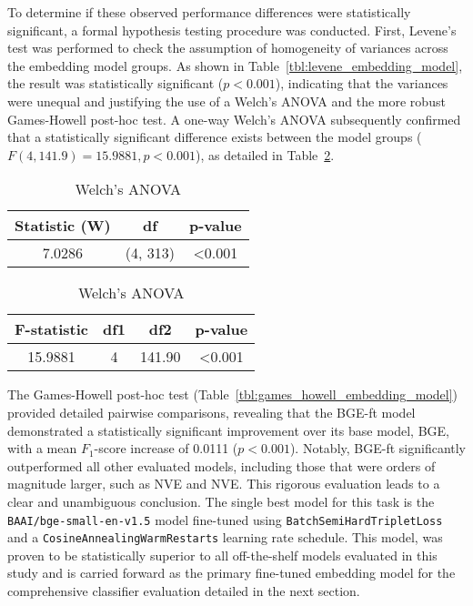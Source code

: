To determine if these observed performance differences were statistically significant, a formal hypothesis testing procedure was conducted. First, Levene's test was performed to check the assumption of homogeneity of variances across the embedding model groups. As shown in Table~\ref{tbl:levene_embedding_model}, the result was statistically significant (\(p < 0.001\)), indicating that the variances were unequal and justifying the use of a Welch's ANOVA and the more robust Games-Howell post-hoc test. A one-way Welch's ANOVA subsequently confirmed that a statistically significant difference exists between the model groups (\(F(4, 141.9) = 15.9881, p < 0.001\)), as detailed in Table~\ref{tbl:anova_embedding_model}.

\begin{table}[tb]
    \captionsetup{skip=5pt}
\centering
\caption{Statistical Tests for F1-Scores by Embedding Model (Test Data)}
\label{tbl:stats_embedding_model}
\begin{subtable}{\linewidth}
\centering
\caption{Levene's Test for Homogeneity of Variances}
\label{tbl:levene_embedding_model}
\begin{tabular}{ccc}
\toprule
\textbf{Statistic (W)} & \textbf{df} & \textbf{p-value} \\
\midrule
7.0286 & (4, 313) & <0.001 \\
\bottomrule
\end{tabular}
\end{subtable}%
\vspace{1em}
\begin{subtable}{\linewidth}
\centering
\caption{Welch's ANOVA}
\label{tbl:anova_embedding_model}
\begin{tabular}{cccc}
\toprule
\textbf{F-statistic} & \textbf{df1} & \textbf{df2} & \textbf{p-value} \\
\midrule
15.9881 & 4 & 141.90 & <0.001 \\
\bottomrule
\end{tabular}
\end{subtable}
\end{table}

The Games-Howell post-hoc test (Table~\ref{tbl:games_howell_embedding_model}) provided detailed pairwise comparisons, revealing that the BGE-ft model demonstrated a statistically significant improvement over its base model, BGE, with a mean \(F_1\)-score increase of 0.0111 (\(p<0.001\)). Notably, BGE-ft significantly outperformed all other evaluated models, including those that were orders of magnitude larger, such as NVE and NVE. This rigorous evaluation leads to a clear and unambiguous conclusion. The single best model for this task is the \verb|BAAI/bge-small-en-v1.5| model fine-tuned using \verb|BatchSemiHardTripletLoss| and a \verb|CosineAnnealingWarmRestarts| learning rate schedule. This model, was proven to be statistically superior to all off-the-shelf models evaluated in this study and is carried forward as the primary fine-tuned embedding model for the comprehensive classifier evaluation detailed in the next section.

